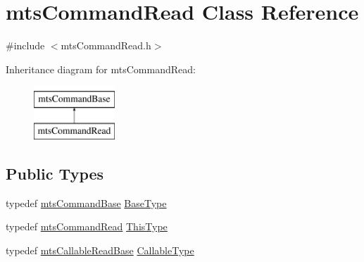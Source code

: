 \hypertarget{classmts_command_read}{}\section{mts\+Command\+Read Class Reference}
\label{classmts_command_read}


{\ttfamily \#include $<$mts\+Command\+Read.\+h$>$}

Inheritance diagram for mts\+Command\+Read\+:\begin{figure}[H]
\begin{center}
\leavevmode
\includegraphics[height=2.000000cm]{d5/d90/classmts_command_read}
\end{center}
\end{figure}
\subsection*{Public Types}
\begin{DoxyCompactItemize}
\item 
typedef \hyperlink{classmts_command_base}{mts\+Command\+Base} \hyperlink{classmts_command_read_a40bc517108c9ab125caf8477013eda34}{Base\+Type}
\item 
typedef \hyperlink{classmts_command_read}{mts\+Command\+Read} \hyperlink{classmts_command_read_aec958a1f6afb4ec00138f7867a1e25b9}{This\+Type}
\item 
typedef \hyperlink{classmts_callable_read_base}{mts\+Callable\+Read\+Base} \hyperlink{classmts_command_read_a5949311ea142c1c13cb29242c5151da6}{Callable\+Type}
\end{DoxyCompactItemize}
